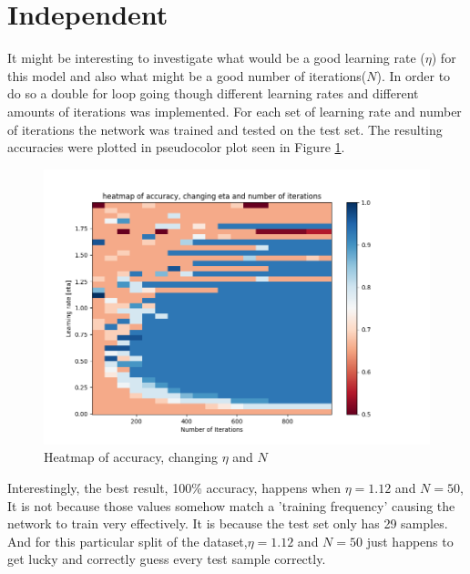 \documentclass{article}
\begin{document}
\section*{Independent}
It might be interesting to investigate what would be a good learning rate (\(\eta\)) for this model and also what might be a good number of iterations(\(N\)). In order to do so a double for loop going though different learning rates and different amounts of iterations was implemented. For each set of learning rate and number of iterations the network was trained and tested on the test set. The resulting accuracies were plotted in pseudocolor plot seen in Figure \ref{fig:indep1}.
\begin{figure}[h]
    \centering
    \includegraphics[width=\textwidth]{05_backprop/indep1.png}
    \caption{Heatmap of accuracy, changing \(\eta\) and \(N\)}
    \label{fig:indep1}
\end{figure}
Interestingly, the best result, 100\% accuracy, happens when \(\eta=1.12\) and \(N=50\), It is not because those values somehow match a 'training frequency' causing the network to train very effectively. It is because the test set only has 29 samples. And for this particular split of the dataset,\(\eta=1.12\) and \(N=50\) just happens to get lucky and correctly guess every test sample correctly.
\end{document}
